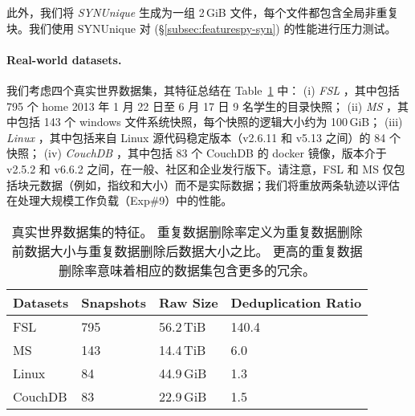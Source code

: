 此外，我们将 {\em SYNUnique} 生成为一组 2\,GiB 文件，每个文件都包含全局非重复块。我们使用 SYNUnique 对 \prototype (\S\ref{subsec:featurespy-syn}) 的性能进行压力测试。

\paragraph*{Real-world datasets.} 我们考虑四个真实世界数据集，其特征总结在 Table~\ref{tab:featurespy-datasets} 中： (i) {\em FSL} \cite{fsl}，其中包括 795 个 home 2013 年 1 月 22 日至 6 月 17 日 9 名学生的目录快照； (ii) {\em MS} \cite{meyer11}，其中包括 143 个 windows 文件系统快照，每个快照的逻辑大小约为 100\,GiB； (iii) {\em Linux} \cite{linux}，其中包括来自 Linux 源代码稳定版本（v2.6.11 和 v5.13 之间）的 84 个快照； (iv) {\em CouchDB} \cite{couchdb}，其中包括 83 个 CouchDB 的 docker 镜像，版本介于 v2.5.2 和 v6.6.2 之间，在一般、社区和企业发行版下。请注意，FSL 和 MS 仅包括块元数据（例如，指纹和大小）而不是实际数据；我们将重放两条轨迹以评估 \prototype 在处理大规模工作负载（Exp\#9）中的性能。

\begin{table}
  \centering
  \small
  \begin{tabular}{|l|l|l|l|}
    \hline
    {\bf Datasets} & {\bf Snapshots} & {\bf Raw Size} & {\bf Deduplication Ratio} \\
    \hline
    \hline
    FSL & 795 & 56.2\,TiB & 140.4 \\
    \hline
    MS & 143 & 14.4\,TiB & 6.0 \\
    \hline
    Linux & 84 & 44.9\,GiB & 1.3 \\
    \hline
    CouchDB & 83 & 22.9\,GiB & 1.5 \\
    \hline
  \end{tabular}
  \caption{真实世界数据集的特征。 重复数据删除率定义为重复数据删除前数据大小与重复数据删除后数据大小之比。 更高的重复数据删除率意味着相应的数据集包含更多的冗余。}
  \vspace{-6pt}
  \label{tab:featurespy-datasets}
\end{table}

